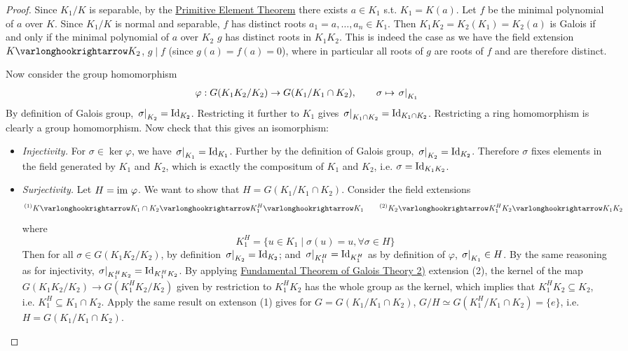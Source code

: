 \begin{proof}
    Since $K_1/K$ is separable, by the \hyperref[thm: primitive element theorem]{Primitive Element Theorem} there exists $a \in K_1$ s.t. $K_1 = K(a)$. Let $f$ be the minimal polynomial of $a$ over $K$. Since $K_1/K$ is normal and separable, $f$ has distinct roots $a_1 = a, \dots, a_n \in K_1$. Then $K_1 K_2 = K_2(K_1) = K_2(a)$ is Galois if and only if the minimal polynomial of $a$ over $K_2$ $g$ has distinct roots in $K_1 K_2$. This is indeed the case as we have the field extension $K \ext K_2$, $g \mid f$ (since $g(a) = f(a) = 0$), where in particular all roots of $g$ are roots of $f$ and are therefore distinct. 

    Now consider the group homomorphism
    \[
        \varphi: G(K_1 K_2/K_2) \to G(K_1/K_1 \cap K_2), \qquad \sigma \mapsto \left.\sigma\right|_{K_1}
    \]
    By definition of Galois group, $\left.\sigma\right|_{K_2} = \mathrm{Id}_{K_2}$. Restricting it further to $K_1$ gives $\left.\sigma\right|_{K_1 \cap K_2} = \mathrm{Id}_{K_1 \cap K_2}$. Restricting a ring homomorphism is clearly a group homomorphism. Now check that this gives an isomorphism:
    \begin{itemize}
        \item \emph{Injectivity.} For $\sigma \in \ker \varphi$, we have $\left.\sigma\right|_{K_1} = \mathrm{Id}_{K_1}$. Further by the definition of Galois group, $\left.\sigma\right|_{K_2} = \mathrm{Id}_{K_2}$. Therefore $\sigma$ fixes elements in the field generated by $K_1$ and $K_2$, which is exactly the compositum of $K_1$ and $K_2$, i.e. $\sigma = \mathrm{Id}_{K_1 K_2}$.
        \item \emph{Surjectivity.} Let $H = \mathrm{im}\  \varphi$. We want to show that $H = G(K_1/K_1 \cap K_2)$. Consider the field extensions
        \[
            ^{\text{(1)}}K \ext K_1 \cap K_2 \ext K_1^H \ext K_1 \qquad ^{\text{(2)}}K_2 \ext K_1^H K_2 \ext K_1 K_2
        \]
        where
        \[
            K_1^H = \{u \in K_1 \mid \sigma(u) = u, \forall \sigma \in H\}
        \]
        Then for all $\sigma \in G(K_1 K_2/K_2)$, by definition $\left.\sigma\right|_{K_2} = \mathrm{Id}_{K_2}$; and $\left.\sigma\right|_{K_1^H} = \mathrm{Id}_{K_1^H}$ as by definition of $\varphi$, $\left.\sigma\right|_{K_1} \in H$. By the same reasoning as for injectivity, $\left.\sigma\right|_{K_1^H K_2} = \mathrm{Id}_{K_1^H K_2}$. By applying \hyperref[thm: fundamental theorem of galois theory]{Fundamental Theorem of Galois Theory 2)} extension (2), the kernel of the map $G(K_1 K_2/K_2) \to G(K_1^H K_2/K_2)$ given by restriction to $K_1^H K_2$ has the whole group as the kernel, which implies that $K_1^H K_2 \subseteq K_2$, i.e. $K_1^H \subseteq K_1 \cap K_2$. Apply the same result on extenson (1) gives for $G = G(K_1/K_1 \cap K_2)$, $G/H \simeq G(K_1^H/K_1 \cap K_2) = \{e\}$, i.e. $H = G(K_1/K_1 \cap K_2)$.
    \end{itemize}
\end{proof}

